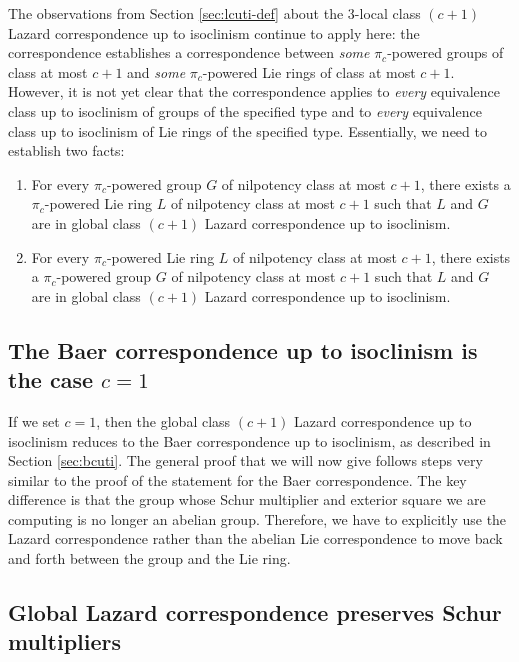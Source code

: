 The observations from Section \ref{sec:lcuti-def} about the $3$-local
class $(c + 1)$ Lazard correspondence up to isoclinism continue to apply
here: the correspondence establishes a correspondence between {\em
  some} $\pi_c$-powered groups of class at most $c + 1$ and {\em some}
$\pi_c$-powered Lie rings of class at most $c + 1$. However, it is not yet clear that the
correspondence applies to {\em every} equivalence class up to
isoclinism of groups of the specified type and to {\em every}
equivalence class up to isoclinism of Lie rings of the specified
type. Essentially, we need to establish two facts:

\begin{enumerate}
\item For every $\pi_c$-powered group $G$ of nilpotency class at most $c
  + 1$, there exists a $\pi_c$-powered Lie ring $L$ of nilpotency class
  at most $c + 1$ such that $L$ and $G$ are in global class $(c + 1)$ Lazard
  correspondence up to isoclinism.
\item For every $\pi_c$-powered Lie ring $L$ of nilpotency class at most
  $c + 1$, there exists a $\pi_c$-powered group $G$ of nilpotency class
  at most $c + 1$ such that $L$ and $G$ are in global class $(c + 1)$ Lazard
  correspondence up to isoclinism.
\end{enumerate}

\subsection{The Baer correspondence up to isoclinism is the case $c = 1$}

If we set $c = 1$, then the global class $(c + 1)$ Lazard
correspondence up to isoclinism reduces to the Baer correspondence up
to isoclinism, as described in Section \ref{sec:bcuti}. The general
proof that we will now give follows steps very similar to the proof of
the statement for the Baer correspondence. The key difference is that
the group whose Schur multiplier and exterior square we are computing
is no longer an abelian group. Therefore, we have to explicitly use
the Lazard correspondence rather than the abelian Lie correspondence
to move back and forth between the group and the Lie ring.


\subsection{Global Lazard correspondence preserves Schur multipliers}\label{sec:global-lazard-correspondence-preserves-schur-multipliers}


